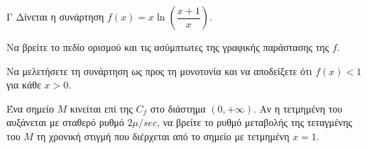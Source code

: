 \begin{thema}{Γ}
Δίνεται η συνάρτηση $f(x) = x \ln\left(\dfrac{x+1}{x}\right)$.
\begin{erwthma}
  \item Να βρείτε το πεδίο ορισμού και τις ασύμπτωτες της γραφικής παράστασης της $f$.
  \item Να μελετήσετε τη συνάρτηση ως προς τη μονοτονία και να αποδείξετε ότι $f(x) < 1$ για κάθε $x > 0$.
  \item Ένα σημείο $M$ κινείται επί της $C_f$ στο διάστημα $(0, +\infty)$. Αν η τετμημένη του αυξάνεται με σταθερό ρυθμό $2 \mu/\si{sec}$, να βρείτε το ρυθμό μεταβολής της τεταγμένης του $M$ τη χρονική στιγμή που διέρχεται από το σημείο με τετμημένη $x=1$.
\end{erwthma}
\end{thema}
